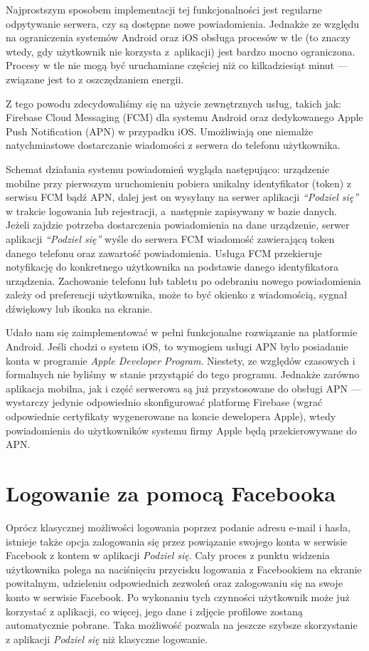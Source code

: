 \documentclass[licencjacka]{pracamgr}
\begin{document}
Najprostszym sposobem implementacji tej funkcjonalności jest regularne odpytywanie serwera, czy są dostępne nowe powiadomienia. Jednakże ze względu na ograniczenia systemów Android oraz iOS obsługa procesów w tle (to znaczy wtedy, gdy użytkownik nie korzysta z~aplikacji) jest bardzo mocno ograniczona. Procesy w tle nie mogą być uruchamiane częściej niż co kilkadziesiąt minut --- związane jest to z oszczędzaniem energii.

Z tego powodu zdecydowaliśmy się na użycie zewnętrznych usług, takich jak: Firebase Cloud Messaging (FCM) dla systemu Android oraz dedykowanego Apple Push Notification (APN) w przypadku iOS\@. Umożliwiają one niemalże natychmiastowe dostarczanie wiadomości z serwera do telefonu użytkownika.

Schemat działania systemu powiadomień wygląda następująco: urządzenie mobilne przy pierwszym uruchomieniu pobiera unikalny identyfikator (token) z serwisu FCM bądź APN, dalej jest on wysyłany na serwer aplikacji \textit{``Podziel się''} w trakcie logowania lub rejestracji, a~następnie zapisywany w bazie danych. Jeżeli zajdzie potrzeba dostarczenia powiadomienia na dane urządzenie, serwer aplikacji \textit{``Podziel się''} wyśle do serwera FCM wiadomość zawierającą token danego telefonu oraz zawartość powiadomienia. Usługa FCM przekieruje notyfikację do konkretnego użytkownika na podstawie danego identyfikatora urządzenia. Zachowanie telefonu lub tabletu po odebraniu nowego powiadomienia zależy od preferencji użytkownika, może to być okienko z wiadomością, sygnał dźwiękowy lub ikonka na ekranie.

Udało nam się zaimplementować w pełni funkcjonalne rozwiązanie na platformie Android. Jeśli chodzi o system iOS, to wymogiem usługi APN było posiadanie konta w programie \textit{Apple Developer Program}. Niestety, ze względów czasowych i formalnych nie byliśmy w stanie przystąpić do tego programu. Jednakże zarówno aplikacja mobilna, jak i część serwerowa są już przystosowane do obsługi APN --- wystarczy jedynie odpowiednio skonfigurować platformę Firebase (wgrać odpowiednie certyfikaty wygenerowane na koncie dewelopera Apple), wtedy powiadomienia do użytkowników systemu firmy Apple będą przekierowywane do APN\@.

\section{Logowanie za pomocą Facebooka}

Oprócz klasycznej możliwości logowania poprzez podanie adresu e-mail i hasła, istnieje także opcja zalogowania się przez powiązanie swojego konta w serwisie Facebook z kontem w aplikacji \textit{Podziel się}. Cały proces z punktu widzenia użytkownika polega na naciśnięciu przycisku logowania z Facebookiem na ekranie powitalnym, udzieleniu odpowiednich zezwoleń oraz zalogowaniu się na swoje konto w serwisie Facebook. Po wykonaniu tych czynności użytkownik może już korzystać z aplikacji, co więcej, jego dane i zdjęcie profilowe zostaną automatycznie pobrane. Taka możliwość pozwala na jeszcze szybsze skorzystanie z aplikacji \textit{Podziel się} niż klasyczne logowanie.
\end{document}

